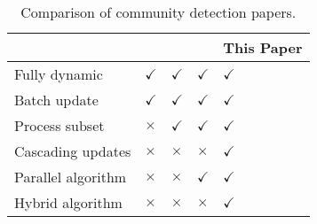 \begin{table}
\setlength{\tabcolsep}{1pt}
\centering
\begin{tabular}{|l|l|l|l|l|} \hline
 & \cite{com-meng16, com-cordeiro16, com-aynaud10, com-chong13} & \cite{com-xie13, com-zhuang19, com-zarayeneh21} & \cite{com-riedy13} & {\bf This Paper} \\ \hline
Fully dynamic & $\checkmark$ & $\checkmark$ & $\checkmark$ & $\checkmark$ \\ \hline
Batch update & $\checkmark$ & $\checkmark$ & $\checkmark$ &  $\checkmark$ \\ \hline
Process subset & $\times$ & $\checkmark$ & $\checkmark$ & $\checkmark$ \\ \hline
Cascading updates & $\times$ & $\times$ & $\times$ & $\checkmark$ \\ \hline
Parallel algorithm & $\times$ & $\times$ & $\checkmark$ & $\checkmark$ \\ \hline
Hybrid algorithm & $\times$ & $\times$ & $\times$ & $\checkmark$ \\ \hline
\end{tabular}
\caption{Comparison of community detection papers.}
\label{tab:compare}
\end{table}
